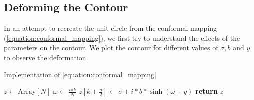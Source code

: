 \documentclass[a4paper]{report}
\begin{document}
\subsection{Deforming the Contour}\label{section:deforming_contour}
In an attempt to recreate the unit circle from the conformal mapping (\autoref{equation:conformal_mapping}), we first try to understand the effects of the parameters on the contour.  We plot the contour for different values of $\sigma, b$ and $y$ to observe the deformation.

\begin{algorithm}[H]
\caption{Implementation of \autoref{equation:conformal_mapping}}
\label{algo:hyperbolic_sine}
\begin{algorithmic}[1]
    \State $z \gets \text{Array}[N]$ 
        \State $\omega \gets \frac{i\pi  k}{N}$
        \State $z[k + \frac{n}{2}] \gets \sigma + i * b * \sinh(\omega + y)$
    \EndFor
    \State \textbf{return} $z$
\EndProcedure
\end{algorithmic}
\end{algorithm}
\end{document}
